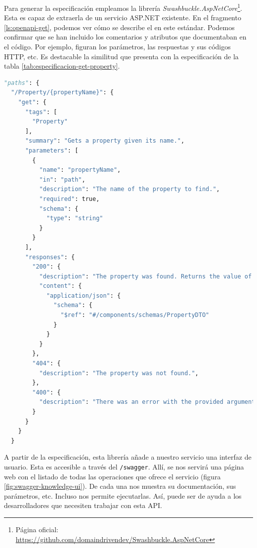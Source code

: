 Para generar la especificación empleamos la librería \emph{Swashbuckle.AspNetCore}\footnote{Página oficial: \url{https://github.com/domaindrivendev/Swashbuckle.AspNetCore}}. Esta es capaz de extraerla de un servicio ASP.NET existente. En el fragmento \ref{ls:openapi-get}, podemos ver cómo se describe el  en este estándar. Podemos confirmar que se han incluido los comentarios y atributos que documentaban en el código. Por ejemplo, figuran los parámetros, las respuestas y sus códigos HTTP, etc. Es destacable la similitud que presenta con la especificación de la tabla \ref{tab:especificacion-get-property}.

\begin{lstlisting}[language=python,caption={Especificación OpenAPI del método para obtener una propiedad del conocimiento (\lstinline{GetProperty}).},captionpos=b, label=ls:openapi-get]
"paths": {
  "/Property/{propertyName}": {
    "get": {
      "tags": [
        "Property"
      ],
      "summary": "Gets a property given its name.",
      "parameters": [
        {
          "name": "propertyName",
          "in": "path",
          "description": "The name of the property to find.",
          "required": true,
          "schema": {
            "type": "string"
          }
        }
      ],
      "responses": {
        "200": {
          "description": "The property was found. Returns the value of the property.",
          "content": {
            "application/json": {
              "schema": {
                "$ref": "#/components/schemas/PropertyDTO"
              }
            }
          }
        },
        "404": {
          "description": "The property was not found.",
        },
        "400": {
          "description": "There was an error with the provided arguments.",
        }
      }
    }
  }
\end{lstlisting}

A partir de la especificación, esta librería añade a nuestro servicio una interfaz de usuario. Esta es accesible a través del  \texttt{/swagger}. Allí, se nos servirá una página web con el listado de todas las operaciones que ofrece el servicio (figura \ref{fig:swagger-knowledge-ui}). De cada una nos muestra su documentación, sus parámetros, etc. Incluso nos permite ejecutarlas. Así, puede ser de ayuda a los desarrolladores que necesiten trabajar con esta API.

